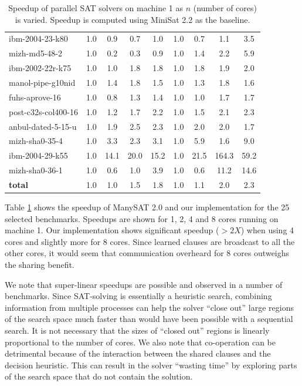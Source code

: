 \documentclass[letterpaper, compsoc, conference]{IEEEtran}
\begin{document}
\begin{table}[htbp]
\begin{center}
\begin{tabular}{|l|c|c|c|c|c|c|c|c|}
        ibm-2004-23-k80                    &       1.0 &  0.9 &  0.7 &  1.0 &  1.0 &  0.7 &  1.1 &  3.5 \\
        mizh-md5-48-2                      &       1.0 &  0.2 &  0.3 &  0.9 &  1.0 &  1.4 &  2.2 &  5.9 \\
        ibm-2002-22r-k75                   &       1.0 &  1.0 &  1.8 &  1.8 &  1.0 &  1.8 &  1.9 &  2.0 \\
        manol-pipe-g10nid                  &       1.0 &  1.4 &  1.8 &  1.5 &  1.0 &  1.3 &  1.8 &  1.6 \\
        fuhs-aprove-16                     &       1.0 &  0.8 &  1.3 &  1.4 &  1.0 &  1.0 &  1.7 &  1.7 \\
        post-c32s-col400-16                &       1.0 &  1.2 &  1.7 &  2.2 &  1.0 &  1.5 &  2.1 &  2.3 \\
        anbul-dated-5-15-u                 &       1.0 &  1.9 &  2.5 &  2.3 &  1.0 &  2.0 &  2.0 &  1.7 \\
        mizh-sha0-35-4                     &       1.0 &  3.3 &  2.3 &  3.1 &  1.0 &  5.9 &  1.6 &  9.0 \\
        ibm-2004-29-k55                    &       1.0 & 14.1 & 20.0 & 15.2 &  1.0 & 21.5 &164.3 & 59.2 \\
        mizh-sha0-36-1                     &       1.0 &  0.6 &  1.0 &  3.9 &  1.0 &  0.6 & 11.2 & 14.6 \\
        \hline
        \textbf{total}                     &       1.0 &  1.0 &  1.5 &  1.8 &  1.0 &  1.1 &  2.0 &  2.3 \\
        \hline
    \end{tabular}
    \end{center}
    \caption{Speedup of parallel SAT solvers on machine 1 as $n$ (number of
    cores) is varied. Speedup is computed using MiniSat 2.2 as the baseline. }
    \label{tab:speedup}
\end{table}

Table \ref{tab:speedup} shows the speedup of ManySAT 2.0 and our
implementation for the 25 selected benchmarks. Speedups are shown for 1, 2, 4
and 8 cores running on machine 1.  Our implementation shows significant speedup
($>2X$) when using 4 cores and slightly more for 8 cores. Since
learned clauses are broadcast to all the other cores, it would seem that
communication overheard for 8 cores outweighs the sharing benefit. 

We note that super-linear speedups are possible and observed in a number of
benchmarks.  Since SAT-solving is essentially a heuristic search, combining
information from multiple processes can help the solver ``close out'' large
regions of the search space much faster than would have been possible with a
sequential search. It is not necessary that the sizes of ``closed out'' regions
is linearly proportional to the number of cores. We also note that co-operation
can be detrimental because of the interaction between the shared clauses and
the decision heuristic.  This can result in the solver ``wasting time'' by
exploring parts of the search space that do not contain the solution.
\end{document}
